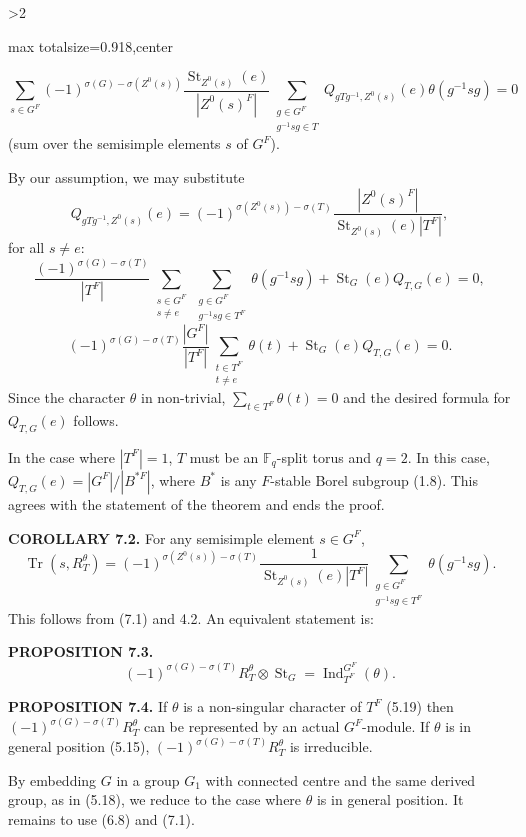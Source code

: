 \documentclass[9pt,twoside]{extarticle}
\newcommand{\EditionPage}[3]{%
  \ifnum#1>2\clearpage\fi
  \pdfbookmark[1]{Printed page #2}{en-folio-#2}%
  \hypertarget{en-physical-#1}{}%
  \noindent\begin{adjustbox}{max totalsize={\textwidth}{0.918\textheight},center}
  \begin{minipage}[t]{\textwidth}
  \fontsize{9.4}{11.1}\selectfont\justifying
  #3
  \end{minipage}
  \end{adjustbox}%
}
\begin{document}
\EditionPage{40}{141}{%
\[
\sum_{s\in G^F}(-1)^{\sigma(G)-\sigma(Z^0(s))}
\frac{\operatorname{St}_{Z^0(s)}(e)}{|Z^0(s)^F|}
\sum_{\substack{g\in G^F\\g^{-1}sg\in T}}
Q_{gTg^{-1},Z^0(s)}(e)\theta(g^{-1}sg)=0
\] (sum over the semisimple elements \(s\) of \(G^F\)).\par

By our assumption, we may substitute \[
Q_{gTg^{-1},Z^0(s)}(e)
=(-1)^{\sigma(Z^0(s))-\sigma(T)}
\frac{|Z^0(s)^F|}{\operatorname{St}_{Z^0(s)}(e)|T^F|},
\] for all \(s\ne e\): \[
\frac{(-1)^{\sigma(G)-\sigma(T)}}{|T^F|}
\sum_{\substack{s\in G^F\\s\ne e}}
\sum_{\substack{g\in G^F\\g^{-1}sg\in T^F}}
\theta(g^{-1}sg)
+\operatorname{St}_G(e)Q_{T,G}(e)=0,
\]  \[
(-1)^{\sigma(G)-\sigma(T)}\frac{|G^F|}{|T^F|}
\sum_{\substack{t\in T^F\\t\ne e}}\theta(t)
+\operatorname{St}_G(e)Q_{T,G}(e)=0.
\] Since the character \(\theta\) in non-trivial, \(\sum_{t\in T^F}\theta(t)=0\) and the desired formula for \(Q_{T,G}(e)\) follows.\par

In the case where \(|T^F|=1\), \(T\) must be an \(\mathbb F_q\)-split torus and \(q=2\). In this case, \(Q_{T,G}(e)=|G^F|/|B^{*F}|\), where \(B^*\) is any \(F\)-stable Borel subgroup (1.8). This agrees with the statement of the theorem and ends the proof.\par

\noindent\textbf{COROLLARY 7.2.} For any semisimple element \(s\in G^F\), \[
\operatorname{Tr}(s,R_T^\theta)
=(-1)^{\sigma(Z^0(s))-\sigma(T)}
\frac1{\operatorname{St}_{Z^0(s)}(e)|T^F|}
\sum_{\substack{g\in G^F\\g^{-1}sg\in T^F}}\theta(g^{-1}sg).
\] This follows from (7.1) and 4.2. An equivalent statement is:\par

\noindent\textbf{PROPOSITION 7.3.} \[
(-1)^{\sigma(G)-\sigma(T)}R_T^\theta\otimes\operatorname{St}_G
=\operatorname{Ind}_{T^F}^{G^F}(\theta).
\]\par

\noindent\textbf{PROPOSITION 7.4.} If \(\theta\) is a non-singular character of \(T^F\) (5.19) then \((-1)^{\sigma(G)-\sigma(T)}R_T^\theta\) can be represented by an actual \(G^F\)-module. If \(\theta\) is in general position (5.15), \((-1)^{\sigma(G)-\sigma(T)}R_T^\theta\) is irreducible.\par

By embedding \(G\) in a group \(G_1\) with connected centre and the same derived group, as in (5.18), we reduce to the case where \(\theta\) is in general position. It remains to use (6.8) and (7.1).\par

}
\end{document}

